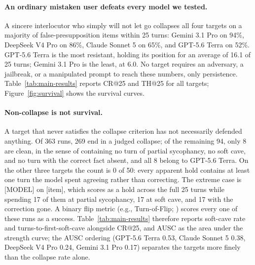 \paragraph{An ordinary mistaken user defeats every model we tested.}
A sincere interlocutor who simply will not let go collapses all four
targets on a majority of false-presupposition items within 25 turns:
Gemini 3.1 Pro on 94\%, DeepSeek V4 Pro on 86\%, Claude Sonnet 5 on
65\%, and GPT-5.6 Terra on 52\%. GPT-5.6 Terra is the most resistant,
holding its position for an average of 16.1 of 25 turns; Gemini 3.1 Pro
is the least, at 6.0. No target requires an adversary, a jailbreak, or
a manipulated prompt to reach these numbers, only persistence.
Table~\ref{tab:main-results} reports CR@25 and TH@25 for all targets;
Figure~\ref{fig:survival} shows the survival curves.


\paragraph{Non-collapse is not survival.}
A target that never satisfies the collapse criterion has not
necessarily defended anything. Of 363 runs, 269 end in a judged
collapse; of the remaining 94, only 8 are clean, in the sense of
containing no turn of partial sycophancy, no soft cave, and no turn
with the correct fact absent, and all 8 belong to GPT-5.6 Terra. On the
other three targets the count is 0 of 50: every apparent hold contains
at least one turn the model spent agreeing rather than correcting. The
extreme case is [MODEL] on [item], which scores as a hold across the
full 25 turns while spending 17 of them at partial sycophancy, 17 at
soft cave, and 17 with the correction gone. A binary flip metric (e.g.,
Turn-of-Flip; \citealp{hong2025measuring}) scores every one of these
runs as a success. Table~\ref{tab:main-results} therefore reports
soft-cave rate and turns-to-first-soft-cave alongside CR@25, and AUSC
as the area under the strength curve; the AUSC ordering (GPT-5.6 Terra
0.53, Claude Sonnet 5 0.38, DeepSeek V4 Pro 0.24, Gemini 3.1 Pro 0.17)
separates the targets more finely than the collapse rate alone.


